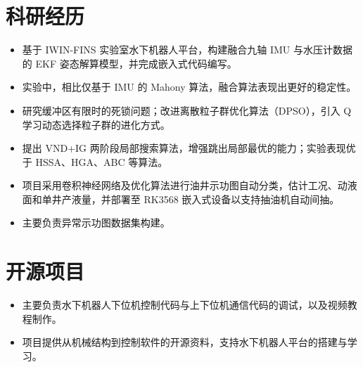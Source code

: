\documentclass[10pt,a4paper]{article}
\begin{document}
\section{科研经历}
\begin{itemize}
  \item 基于 IWIN-FINS 实验室水下机器人平台，构建融合九轴 IMU 与水压计数据的 EKF 姿态解算模型，并完成嵌入式代码编写。
  \item 实验中，相比仅基于 IMU 的 Mahony 算法，融合算法表现出更好的稳定性。
\end{itemize}
\begin{itemize}
  \item 研究缓冲区有限时的死锁问题；改进离散粒子群优化算法（DPSO），引入 Q 学习动态选择粒子群的进化方式。
  \item 提出 VND+IG 两阶段局部搜索算法，增强跳出局部最优的能力；实验表现优于 HSSA、HGA、ABC 等算法。
\end{itemize}
\begin{itemize}
  \item 项目采用卷积神经网络及优化算法进行油井示功图自动分类，估计工况、动液面和单井产液量，并部署至 RK3568 嵌入式设备以支持抽油机自动间抽。
  \item 主要负责异常示功图数据集构建。
\end{itemize}

\newpage
\section{开源项目}
\begin{itemize}
  \item 主要负责水下机器人下位机控制代码与上下位机通信代码的调试，以及视频教程制作。
  \item 项目提供从机械结构到控制软件的开源资料，支持水下机器人平台的搭建与学习。
\end{itemize}
{\small{}\cvdivider{}}
\end{document}
